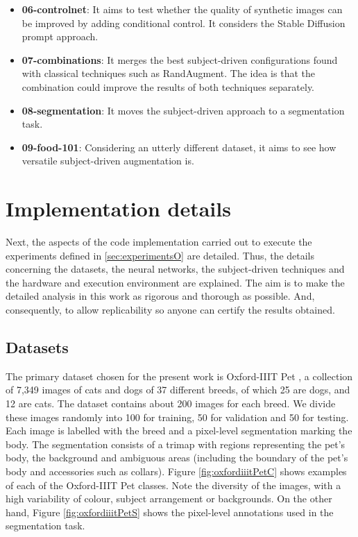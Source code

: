 \begin{itemize}
    \item \textbf{06-controlnet}: It aims to test whether the quality of synthetic images can be improved by adding conditional control. It considers the Stable Diffusion prompt approach. 
    \item \textbf{07-combinations}: It merges the best subject-driven configurations found with classical techniques such as RandAugment. The idea is that the combination could improve the results of both techniques separately.
    \item \textbf{08-segmentation}: It moves the subject-driven approach to a segmentation task. 
    \item \textbf{09-food-101}: Considering an utterly different dataset, it aims to see how versatile subject-driven augmentation is.
\end{itemize}

\section{Implementation details} \label{sec: implemantationD}

Next, the aspects of the code implementation carried out to execute the experiments defined in \ref{sec:experimentsO} are detailed. Thus, the details concerning the datasets, the neural networks, the subject-driven techniques and the hardware and execution environment are explained. The aim is to make the detailed analysis in this work as rigorous and thorough as possible. And, consequently, to allow replicability so anyone can certify the results obtained.

\subsection{Datasets}

The primary dataset chosen for the present work is Oxford-IIIT Pet \cite{Parkhi2012CatsAD}, a collection of 7,349 images of cats and dogs of 37 different breeds, of which 25 are dogs, and 12 are cats. The dataset contains about 200 images for each breed. We divide these images randomly into 100 for training, 50 for validation and 50 for testing. Each image is labelled with the breed and a pixel-level segmentation marking the body. The segmentation consists of a trimap with regions representing the pet's body, the background and ambiguous areas (including the boundary of the pet's body and accessories such as collars). Figure \ref{fig:oxfordiiitPetC} shows examples of each of the Oxford-IIIT Pet classes. Note the diversity of the images, with a high variability of colour, subject arrangement or backgrounds. On the other hand, Figure \ref{fig:oxfordiiitPetS} shows the pixel-level annotations used in the segmentation task. 

